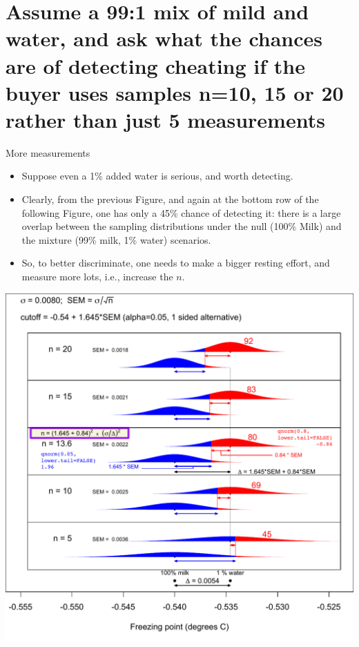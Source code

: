 \documentclass{beamer}\usepackage[]{graphicx}\usepackage[]{color}
\begin{document}
\section{Assume a 99:1 mix of mild and water, and ask what the chances are of detecting cheating if the buyer uses samples
	n=10, 15 or 20 rather than just 5 measurements}

\begin{frame}{More measurements}

\begin{itemize}
	\item Suppose even a 1\% added water is serious, and worth detecting.
\item Clearly, from the previous Figure, and again at the bottom row of the following Figure,
one has only a 45\% chance of detecting it: there is a large overlap between the sampling distributions under the null (100\% Milk) and the mixture (99\% milk, 1\% water) scenarios.

\item So, to better discriminate, one needs to make a bigger resting effort, and measure more lots,
i.e., increase the $n$.
\end{itemize}
\end{frame}

\begin{frame}
\begin{center}
	\includegraphics[scale=0.5]{SampleSize1pctWaterAdded.pdf} 
\end{center}
\end{frame}
\end{document}
